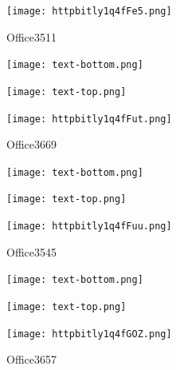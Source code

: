\documentclass[letterpaper]{article}
\begin{document}
 \begingroup 
 \centerline{\texttt{[image: httpbitly1q4fFe5.png]}} 
 \endgroup 
 \vspace*{\fill} 

 \hfill{\small Office3511} 

  \vspace{0.7in} 
 
 \centerline{\texttt{[image: text-bottom.png]}} 
 
 \pagebreak 
{} 
 \vspace*{\fill} 
 
  \centerline{\texttt{[image: text-top.png]}} 
 
 \vspace{0.5in} 
 
 \begingroup 
 \centerline{\texttt{[image: httpbitly1q4fFut.png]}} 
 \endgroup 
 \vspace*{\fill} 

 \hfill{\small Office3669} 

  \vspace{0.7in} 
 
 \centerline{\texttt{[image: text-bottom.png]}} 
 
 \pagebreak 
{} 
 \vspace*{\fill} 
 
  \centerline{\texttt{[image: text-top.png]}} 
 
 \vspace{0.5in} 
 
 \begingroup 
 \centerline{\texttt{[image: httpbitly1q4fFuu.png]}} 
 \endgroup 
 \vspace*{\fill} 

 \hfill{\small Office3545} 

  \vspace{0.7in} 
 
 \centerline{\texttt{[image: text-bottom.png]}} 
 
 \pagebreak 
{} 
 \vspace*{\fill} 
 
  \centerline{\texttt{[image: text-top.png]}} 
 
 \vspace{0.5in} 
 
 \begingroup 
 \centerline{\texttt{[image: httpbitly1q4fGOZ.png]}} 
 \endgroup 
 \vspace*{\fill} 

 \hfill{\small Office3657} 

  \vspace{0.7in} 
 
\end{document}
